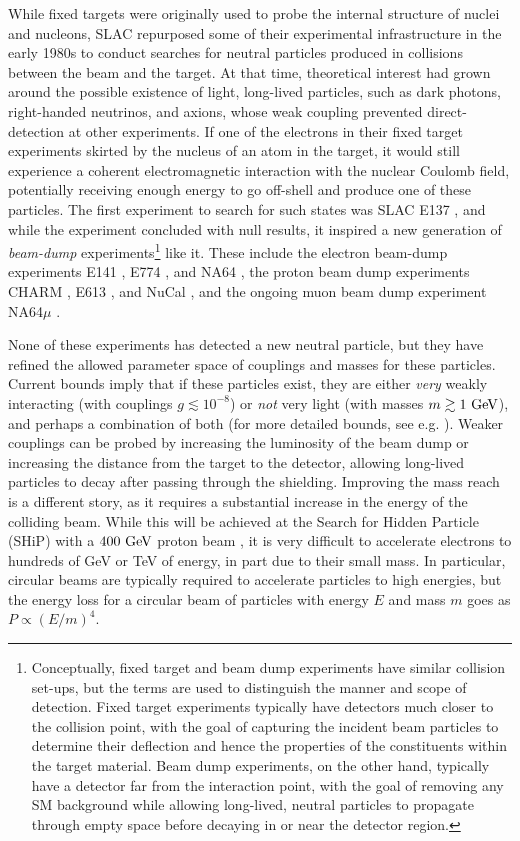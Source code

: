 While fixed targets were originally used to probe the internal structure of nuclei and nucleons, SLAC repurposed some of their experimental infrastructure in the early 1980s to conduct searches for neutral particles produced in collisions between the beam and the target. At that time, theoretical interest had grown around the possible existence of light, long-lived particles, such as dark photons, right-handed neutrinos, and axions, whose weak coupling prevented direct-detection at other experiments. If one of the electrons in their fixed target experiments skirted by the nucleus of an atom in the target, it would still experience a coherent electromagnetic interaction with the nuclear Coulomb field, potentially receiving enough energy to go off-shell and produce one of these particles. The first experiment to search for such states was SLAC E137 \cite{Bjorken:1984mt}, and while the experiment concluded with null results, it inspired a new generation of {\it beam-dump} experiments\footnote{Conceptually, fixed target and beam dump experiments have similar collision set-ups, but the terms are used to distinguish the manner and scope of detection. Fixed target experiments typically have detectors much closer to the collision point, with the goal of capturing the incident beam particles to determine their deflection and hence the properties of the constituents within the target material. Beam dump experiments, on the other hand, typically have a detector far from the interaction point, with the goal of removing any SM background while allowing long-lived, neutral particles to propagate through empty space before decaying in or near the detector region.} like it. These include the electron beam-dump experiments E141 \cite{Riordan:1986wi}, E774 \cite{Bross:1989mp}, and NA64 \cite{Gninenko:2017acc}, the proton beam dump experiments CHARM \cite{CHARM:1985nku},  E613 \cite{Ball:1980ojt}, and NuCal \cite{Blumlein:2011mv}, and the ongoing muon beam dump experiment NA64$\mu$ \cite{Gertsenberger:2023ree}. 

None of these experiments has detected a new neutral particle, but they have refined the allowed parameter space of couplings and masses for these particles. Current bounds imply that if these particles exist, they are either {\it very} weakly interacting (with couplings $g \lesssim 10^{-8}$) or {\it not} very light (with masses $m \gtrsim 1~{\rm GeV}$), and perhaps a combination of both (for more detailed bounds, see e.g. \cite{Bauer:2021mvw,Batell:2022dpx}). Weaker couplings can be probed by increasing the luminosity of the beam dump or increasing the distance from the target to the detector, allowing long-lived particles to decay after passing through the shielding. Improving the mass reach is a different story, as it requires a substantial increase in the energy of the colliding beam. While this will be achieved at the Search for Hidden Particle (SHiP) with a $400~{\rm GeV}$ proton beam \cite{SHiP:2015vad, SHiP:2021nfo}, it is very difficult to accelerate electrons to hundreds of GeV or TeV of energy, in part due to their small mass. In particular, circular beams are typically required to accelerate particles to high energies, but the energy loss for a circular beam of particles with energy $E$ and mass $m$ goes as $P \propto (E/m)^4$.


